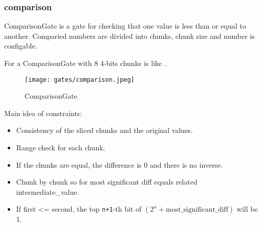 \subsubsection{comparison}

ComparisonGate is a gate for checking that one value is less than or equal to another. 
Comparied numbers are divided into chunks, chunk size and number is configable.

For a ComparisonGate with 8 4-bits chunks is like .

\begin{figure}[!ht]
    \centering
    \texttt{[image: gates/comparison.jpeg]}
    \caption{ComparisonGate}
    \label{fig:comparison}
\end{figure}

Main idea of constraints:
\begin{itemize}
    \item Consistency of the sliced chunks and the original values.
    \item Range check for each chunk.
    \item If the chunks are equal, the difference is 0 and there is no inverse.
    \item Chunk by chunk so for most significant diff equals related intermediate\_value.
    \item If first <= second, the top \verb|n+1|-th bit of $(2^n + \text{most\_significant\_diff})$ will be 1.
\end{itemize}
